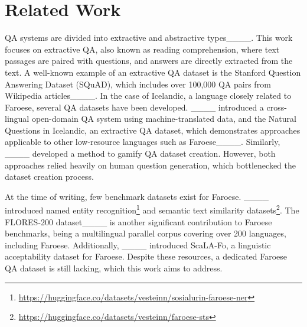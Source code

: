 \section{Related Work}
\label{sec:related_work}

QA systems are divided into extractive and abstractive types____.
This work focuses on extractive QA, also known as reading comprehension, where text
passages are paired with questions, and answers are directly extracted from the text. A
well-known example of an extractive QA dataset is the Stanford Question Answering
Dataset (SQuAD), which includes over 100,000 QA pairs from Wikipedia
articles____. In the case of Icelandic, a language closely related
to Faroese, several QA datasets have been developed.
____ introduced a cross-lingual open-domain QA
system using machine-translated data, and the Natural Questions in Icelandic, an
extractive QA dataset, which demonstrates approaches applicable to other low-resource
languages such as Faroese____. Similarly,
____ developed a method to gamify QA dataset
creation. However, both approaches relied heavily on human question generation, which
bottlenecked the dataset creation process.

At the time of writing, few benchmark datasets exist for Faroese.
____ introduced named entity
recognition\footnote{\url{https://huggingface.co/datasets/vesteinn/sosialurin-faroese-ner}}
and semantic text similarity
datasets\footnote{\url{https://huggingface.co/datasets/vesteinn/faroese-sts}}. The
FLORES-200 dataset____ is another significant contribution to Faroese
benchmarks, being a multilingual parallel corpus covering over 200 languages, including
Faroese. Additionally, ____ introduced ScaLA-Fo, a linguistic
acceptability dataset for Faroese. Despite these resources, a dedicated Faroese QA
dataset is still lacking, which this work aims to address.